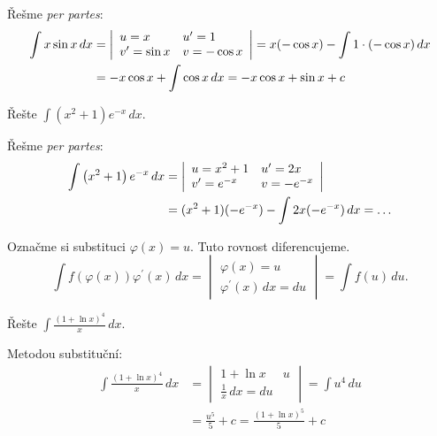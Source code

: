 \begin{reseni}
Řešme \textit{per partes}:
\begin{align*}
\int x \sin x \, dx &=\left |\begin{array}{l l}
    u=x & u^\prime= 1\\
    v^\prime = \sin x & v=-\cos x
\end{array} \right | = x(-\cos x)-\int 1\cdot(-\cos x)\, dx \\
&= -x\cos x+\int \cos x \, dx=-x \cos x +\sin x+c
\end{align*}
\end{reseni}

\begin{priklad}
Řešte $\int (x^2+1)e^{-x}\, dx.$
\end{priklad}

\begin{reseni}
Řešme \textit{per partes}:
\begin{align*}
    \int \left ( x^2+1 \right )e^{-x}\, dx &= \left |\begin{array}{l l}
        u=x^2+1 & u^\prime= 2x\\
        v^\prime = e^{-x} & v=-e^{-x}
    \end{array} \right | \\
    &= (x^2+1)(-e^{-x})-\int 2x(-e^{-x})\, dx = \dots
\end{align*}
\end{reseni}

\begin{pozn}
    Označme si substituci $\varphi(x)=u.$ Tuto rovnost diferencujeme.
    $$\int f(\varphi(x))\varphi^\prime(x)\, dx=\begin{vmatrix}
        \varphi(x)=u \\
        \varphi^\prime(x) \, dx=du
    \end{vmatrix}=\int f(u)\, du.$$
\end{pozn}

\begin{priklad}
Řešte $\int \frac{(1+\ln x)^4}{x}\, dx.$
\end{priklad}

\begin{reseni}
Metodou substituční:
\begin{align*}
    \int \frac{(1+\ln x)^4}{x}\, dx &= \begin{vmatrix}
        1+\ln x&u \\
        \frac{1}{x}\, dx=du
    \end{vmatrix}=\int u^4\, du \\
    &=\frac{u^5}{5}+c=\frac{(1+\ln x)^5}{5}+c
\end{align*}
\end{reseni}

